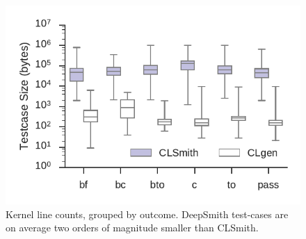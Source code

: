\begin{figure}
	\centering %
	\includegraphics[width=\columnwidth]{build/img/kernel-sizes}%
	\caption{%
		Kernel line counts, grouped by outcome. DeepSmith test-cases are on average two orders of magnitude smaller than CLSmith.%
	}%
	\label{fig:kernel-sizes} %
\end{figure}


